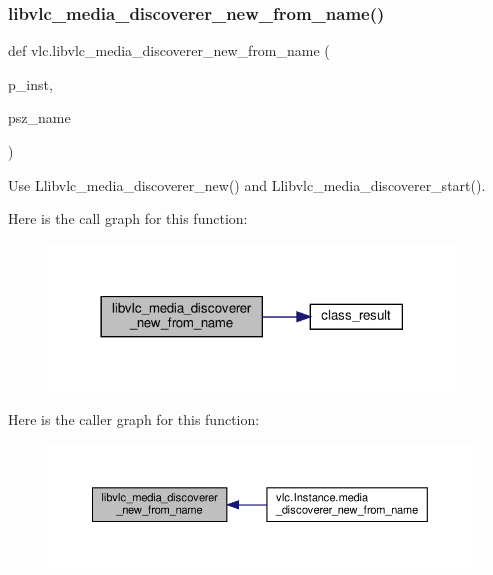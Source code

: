 \subsubsection{\texorpdfstring{libvlc\+\_\+media\+\_\+discoverer\+\_\+new\+\_\+from\+\_\+name()}{libvlc\_media\_discoverer\_new\_from\_name()}}
{\footnotesize\ttfamily def vlc.\+libvlc\+\_\+media\+\_\+discoverer\+\_\+new\+\_\+from\+\_\+name (\begin{DoxyParamCaption}\item[{}]{p\+\_\+inst,  }\item[{}]{psz\+\_\+name }\end{DoxyParamCaption})}

\begin{DoxyVerb}\deprecated Use L{libvlc_media_discoverer_new}() and L{libvlc_media_discoverer_start}().
\end{DoxyVerb}
 Here is the call graph for this function\+:
\nopagebreak
\begin{figure}[H]
\begin{center}
\leavevmode
\includegraphics[width=306pt]{namespacevlc_a767b87c1a19544f94b98794de5728cde_cgraph}
\end{center}
\end{figure}
Here is the caller graph for this function\+:
\nopagebreak
\begin{figure}[H]
\begin{center}
\leavevmode
\includegraphics[width=350pt]{namespacevlc_a767b87c1a19544f94b98794de5728cde_icgraph}
\end{center}
\end{figure}
\mbox{\label{namespacevlc_adddb8a8785beb08b0599ccb43c3ddffd}} 
